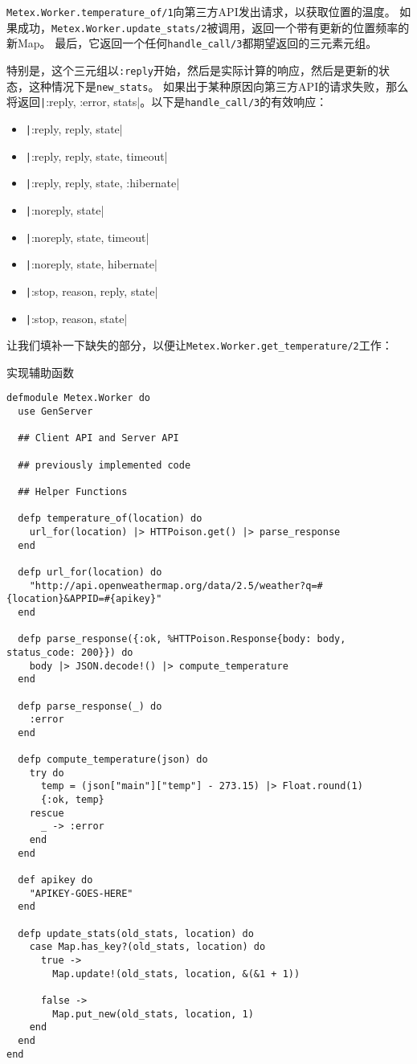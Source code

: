 \texttt{Metex.Worker.temperature\_of/1}向第三方API发出请求，以获取位置的温度。
如果成功，\texttt{Metex.Worker.update\_stats/2}被调用，返回一个带有更新的位置频率的新Map。
最后，它返回一个任何\texttt{handle\_call/3}都期望返回的三元素元组。

特别是，这个三元组以\texttt{:reply}开始，然后是实际计算的响应，然后是更新的状态，这种情况下是\texttt{new\_stats}。
如果出于某种原因向第三方API的请求失败，那么将返回\texttt|{:reply, :error, stats}|。以下是\texttt{handle\_call/3}的有效响应：

\begin{itemize}

\item  \texttt|{:reply, reply, state}|
\item  \texttt|{:reply, reply, state, timeout}|
\item  \texttt|{:reply, reply, state, :hibernate}|
\item  \texttt|{:noreply, state}|
\item  \texttt|{:noreply, state, timeout}|
\item  \texttt|{:noreply, state, hibernate}|
\item  \texttt|{:stop, reason, reply, state}|
\item  \texttt|{:stop, reason, state}|
\end{itemize}

让我们填补一下缺失的部分，以便让\texttt{Metex.Worker.get\_temperature/2}工作：

\begin{code}{实现辅助函数}
\begin{verbatim}
defmodule Metex.Worker do
  use GenServer

  ## Client API and Server API

  ## previously implemented code

  ## Helper Functions

  defp temperature_of(location) do
    url_for(location) |> HTTPoison.get() |> parse_response
  end

  defp url_for(location) do
    "http://api.openweathermap.org/data/2.5/weather?q=#{location}&APPID=#{apikey}"
  end

  defp parse_response({:ok, %HTTPoison.Response{body: body, status_code: 200}}) do
    body |> JSON.decode!() |> compute_temperature
  end

  defp parse_response(_) do
    :error
  end

  defp compute_temperature(json) do
    try do
      temp = (json["main"]["temp"] - 273.15) |> Float.round(1)
      {:ok, temp}
    rescue
      _ -> :error
    end
  end

  def apikey do
    "APIKEY-GOES-HERE"
  end

  defp update_stats(old_stats, location) do
    case Map.has_key?(old_stats, location) do
      true ->
        Map.update!(old_stats, location, &(&1 + 1))

      false ->
        Map.put_new(old_stats, location, 1)
    end
  end
end
\end{verbatim}
\label{lst:helper_functions}
\end{code}


